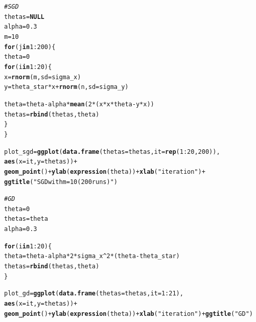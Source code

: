 \documentclass[a4paper]{article}
\makeatletter
\newcommand{\hlnum}[1]{\textcolor[rgb]{0.686,0.059,0.569}{#1}}%
\newcommand{\hlstr}[1]{\textcolor[rgb]{0.192,0.494,0.8}{#1}}%
\newcommand{\hlcom}[1]{\textcolor[rgb]{0.678,0.584,0.686}{\textit{#1}}}%
\newcommand{\hlopt}[1]{\textcolor[rgb]{0,0,0}{#1}}%
\newcommand{\hlstd}[1]{\textcolor[rgb]{0.345,0.345,0.345}{#1}}%
\newcommand{\hlkwa}[1]{\textcolor[rgb]{0.161,0.373,0.58}{\textbf{#1}}}%
\newcommand{\hlkwb}[1]{\textcolor[rgb]{0.69,0.353,0.396}{#1}}%
\newcommand{\hlkwc}[1]{\textcolor[rgb]{0.333,0.667,0.333}{#1}}%
\newcommand{\hlkwd}[1]{\textcolor[rgb]{0.737,0.353,0.396}{\textbf{#1}}}%
\newenvironment{kframe}{%
 \def\at@end@of@kframe{}%
 \ifinner\ifhmode%
  \def\at@end@of@kframe{\end{minipage}}%
  \begin{minipage}{\columnwidth}%
 \fi\fi%
 \def\FrameCommand##1{\hskip\@totalleftmargin \hskip-\fboxsep
 \colorbox{shadecolor}{##1}\hskip-\fboxsep
     \hskip-\linewidth \hskip-\@totalleftmargin \hskip\columnwidth}%
 \MakeFramed {\advance\hsize-\width
   \@totalleftmargin\z@ \linewidth\hsize
   \@setminipage}}%
 {\par\unskip\endMakeFramed%
 \at@end@of@kframe}
\newenvironment{knitrout}{}{} %
\makeatother
\begin{document}
{\begin{enumerate}
\begin{knitrout}
\begin{kframe}
\begin{alltt}
\hlcom{# SGD}
\hlstd{thetas} \hlkwb{=} \hlkwa{NULL}
\hlstd{alpha} \hlkwb{=} \hlnum{0.3}
\hlstd{m} \hlkwb{=} \hlnum{10}
\hlkwa{for}\hlstd{(j} \hlkwa{in} \hlnum{1}\hlopt{:}\hlnum{200}\hlstd{)\{}
  \hlstd{theta} \hlkwb{=} \hlnum{0}
  \hlkwa{for}\hlstd{(i} \hlkwa{in} \hlnum{1}\hlopt{:}\hlnum{20}\hlstd{)\{}
    \hlstd{x} \hlkwb{=} \hlkwd{rnorm}\hlstd{(m,} \hlkwc{sd} \hlstd{= sigma_x)}
    \hlstd{y} \hlkwb{=} \hlstd{theta_star} \hlopt{*} \hlstd{x} \hlopt{+} \hlkwd{rnorm}\hlstd{(n,} \hlkwc{sd} \hlstd{= sigma_y)}

    \hlstd{theta} \hlkwb{=} \hlstd{theta}  \hlopt{-} \hlstd{alpha} \hlopt{*} \hlkwd{mean}\hlstd{(}\hlnum{2}\hlopt{*}\hlstd{(x}\hlopt{*}\hlstd{x}\hlopt{*}\hlstd{theta} \hlopt{-} \hlstd{y}\hlopt{*}\hlstd{x))}
    \hlstd{thetas} \hlkwb{=} \hlkwd{rbind}\hlstd{(thetas, theta)}
  \hlstd{\}}
\hlstd{\}}

\hlstd{plot_sgd} \hlkwb{=} \hlkwd{ggplot}\hlstd{(}\hlkwd{data.frame}\hlstd{(}\hlkwc{thetas} \hlstd{= thetas,} \hlkwc{it} \hlstd{=} \hlkwd{rep}\hlstd{(}\hlnum{1}\hlopt{:}\hlnum{20}\hlstd{,} \hlnum{200}\hlstd{)),}
       \hlkwd{aes}\hlstd{(}\hlkwc{x} \hlstd{= it,} \hlkwc{y} \hlstd{= thetas))} \hlopt{+}
  \hlkwd{geom_point}\hlstd{()} \hlopt{+} \hlkwd{ylab}\hlstd{(}\hlkwd{expression}\hlstd{(theta))} \hlopt{+} \hlkwd{xlab}\hlstd{(}\hlstr{"iteration"}\hlstd{)} \hlopt{+}
  \hlkwd{ggtitle}\hlstd{(}\hlstr{"SGD with m=10 (200 runs)"}\hlstd{)}

\hlcom{# GD }
\hlstd{theta} \hlkwb{=} \hlnum{0}
\hlstd{thetas} \hlkwb{=} \hlstd{theta}
\hlstd{alpha} \hlkwb{=} \hlnum{0.3}

\hlkwa{for}\hlstd{(i} \hlkwa{in} \hlnum{1}\hlopt{:}\hlnum{20}\hlstd{)\{}
  \hlstd{theta} \hlkwb{=} \hlstd{theta}  \hlopt{-} \hlstd{alpha} \hlopt{*}  \hlnum{2}\hlopt{*}\hlstd{sigma_x}\hlopt{^}\hlnum{2}\hlopt{*}\hlstd{(theta} \hlopt{-} \hlstd{theta_star)}
  \hlstd{thetas} \hlkwb{=} \hlkwd{rbind}\hlstd{(thetas, theta)}
\hlstd{\}}

\hlstd{plot_gd} \hlkwb{=} \hlkwd{ggplot}\hlstd{(}\hlkwd{data.frame}\hlstd{(}\hlkwc{thetas} \hlstd{= thetas,} \hlkwc{it} \hlstd{=} \hlnum{1}\hlopt{:}\hlnum{21}\hlstd{),}
                 \hlkwd{aes}\hlstd{(}\hlkwc{x} \hlstd{= it,} \hlkwc{y} \hlstd{= thetas))} \hlopt{+}
  \hlkwd{geom_point}\hlstd{()} \hlopt{+} \hlkwd{ylab}\hlstd{(}\hlkwd{expression}\hlstd{(theta))} \hlopt{+} \hlkwd{xlab}\hlstd{(}\hlstr{"iteration"}\hlstd{)} \hlopt{+} \hlkwd{ggtitle}\hlstd{(}\hlstr{"GD"}\hlstd{)}


\end{alltt}
\end{kframe}
\end{knitrout}
\end{enumerate}}
\end{document}

